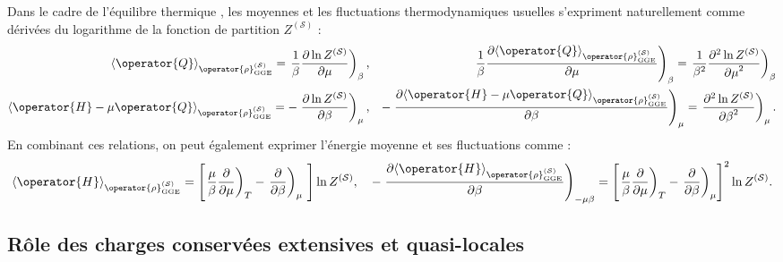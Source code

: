 Dans le cadre de l’équilibre thermique , les moyennes et les fluctuations thermodynamiques usuelles s’expriment naturellement comme dérivées du logarithme de la fonction de partition $Z^{(\mathcal{S})}$ :
\begin{eqnarray}
	\langle \operator{Q} \rangle_{\operator{\rho}^{(\mathcal{S})}_{\mathrm{GGE}}}  = \left .\frac{1}{\beta} \frac{ \partial \ln Z^{(\mathcal{S})}}{\partial \mu } \right )_{\beta},  & &  \left . \frac{1}{\beta} \frac{ \partial \langle \operator{Q} \rangle_{\operator{\rho}^{(\mathcal{S})}_{\mathrm{GGE}}}}{\partial \mu } \right )_{\beta} =  \left . \frac{1}{\beta^2} \frac{ \partial^2 \ln Z^{(\mathcal{S})}}{{\partial \mu}^2 } \right )_{\beta} \\
	\langle \operator{H} - \mu\operator{Q}  \rangle_{\operator{\rho}^{(\mathcal{S})}_{\mathrm{GGE}}}  = -\left . \frac{ \partial \ln Z^{(\mathcal{S})}}{\partial \beta } \right )_{\mu} ,  & & -\left .  \frac{ \partial \langle \operator{H} - \mu\operator{Q} \rangle_{\operator{\rho}^{(\mathcal{S})}_{\mathrm{GGE}}}}{\partial \beta } \right )_{\mu } = \left .  \frac{ \partial^2 \ln Z^{(\mathcal{S})}}{{\partial \beta}^2 } \right )_{\mu}   .		
\end{eqnarray}
En combinant ces relations, on peut également exprimer l’énergie moyenne et ses fluctuations comme :
\begin{eqnarray}
	\langle \operator{H} \rangle_{\operator{\rho}^{(\mathcal{S})}_{\mathrm{GGE}}}  = \left [ \left .\frac{\mu}{\beta} \frac{ \partial}{\partial \mu } \right )_{T} -\left . \frac{ \partial }{\partial \beta } \right )_{\mu}   \right ]\ln Z^{(\mathcal{S})},  \quad  -\left .  \frac{ \partial \langle \operator{H} \rangle_{\operator{\rho}^{(\mathcal{S})}_{\mathrm{GGE}}}}{\partial \beta } \right )_{-\mu \beta } = \left [ \left .\frac{\mu}{\beta} \frac{ \partial}{\partial \mu } \right )_{T} -\left . \frac{ \partial }{\partial \beta } \right )_{\mu}  \right ]^2\ln Z^{(\mathcal{S})}.		
\end{eqnarray}






%
\subsection{Rôle des charges conservées extensives et quasi-locales}

